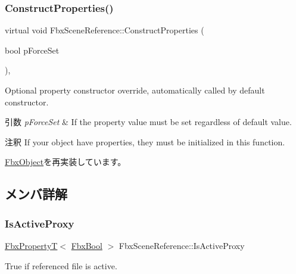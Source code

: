 \subsubsection{\texorpdfstring{Construct\+Properties()}{ConstructProperties()}}
{\footnotesize\ttfamily virtual void Fbx\+Scene\+Reference\+::\+Construct\+Properties (\begin{DoxyParamCaption}\item[{bool}]{p\+Force\+Set }\end{DoxyParamCaption})\hspace{0.3cm}{\ttfamily [protected]}, {\ttfamily [virtual]}}

Optional property constructor override, automatically called by default constructor. 
\begin{DoxyParams}{引数}
{\em p\+Force\+Set} & If the property value must be set regardless of default value. \\
\hline
\end{DoxyParams}
\begin{DoxyRemark}{注釈}
If your object have properties, they must be initialized in this function. 
\end{DoxyRemark}


\hyperlink{class_fbx_object_ad44f814323dc1b5e78bff1bfc608b4bb}{Fbx\+Object}を再実装しています。



\subsection{メンバ詳解}
\mbox{\label{class_fbx_scene_reference_aab3571ac4fd553d5f3fbb3710c39adac}} 
\subsubsection{\texorpdfstring{Is\+Active\+Proxy}{IsActiveProxy}}
{\footnotesize\ttfamily \hyperlink{class_fbx_property_t}{Fbx\+PropertyT}$<$ \hyperlink{fbxtypes_8h_a92e0562b2fe33e76a242f498b362262e}{Fbx\+Bool} $>$ Fbx\+Scene\+Reference\+::\+Is\+Active\+Proxy}



{\ttfamily True} if referenced file is active. 

\mbox{\label{class_fbx_scene_reference_a971731e9c034714443001ee94de52562}} 
